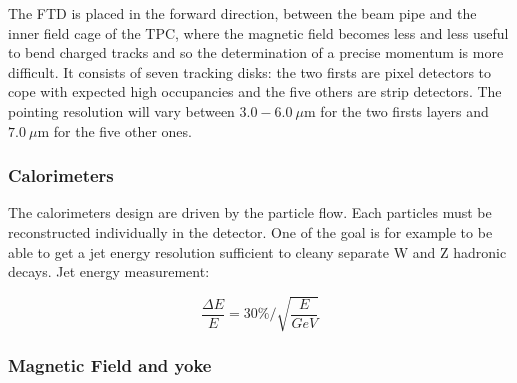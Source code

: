      The FTD is placed in the forward direction, between the beam pipe and the inner field cage of the TPC, where the magnetic field becomes less and less useful to bend charged tracks and so the determination of a precise momentum is more difficult.
     It consists of seven tracking disks: the two firsts are pixel detectors to cope with expected high occupancies and the five others are strip detectors.
     The pointing resolution will vary between $3.0-6.0 \ \mu$m for the two firsts layers and $7.0 \ \mu$m for the five other ones.
     


      \subsubsection{Calorimeters}

      The calorimeters design are driven by the particle flow.
      Each particles must be reconstructed individually in the detector.
      One of the goal is for example to be able to get a jet energy resolution sufficient to cleany separate W and Z hadronic decays.
      Jet energy measurement: 

      \begin{equation}
        \frac{\Delta E}{E} = 30 \% / \sqrt{\frac{E}{GeV}}
        \label{eq:jetRes}
      \end{equation}

      



      \subsubsection{Magnetic Field and yoke}

